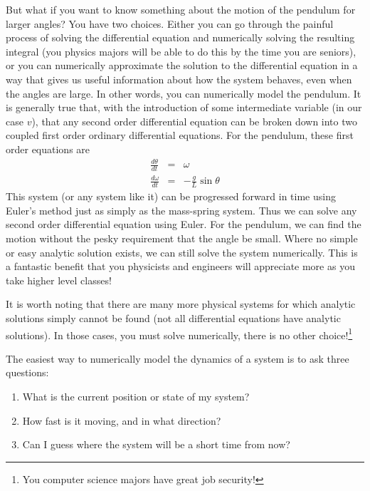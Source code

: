 \documentclass[twoside,11pt,ShortChapTitles]{BYUTextbook}
\begin{document}
But what if you want to know something about the motion of the pendulum for
larger angles? You have two choices. Either you can go through the painful
process of solving the differential equation and numerically solving the
resulting integral (you physics majors will be able to do this by the time
you are seniors), or you can numerically approximate the solution to the
differential equation in a way that gives us useful information about how
the system behaves, even when the angles are large. In other words, you can
numerically model the pendulum. It is generally true that, with the
introduction of some intermediate variable (in our case $v$), that any
second order differential equation can be broken down into two coupled first
order ordinary differential equations. For the pendulum, these first order
equations are 
\begin{eqnarray*}
\frac{d\theta }{dt} &=&\omega \\
\frac{d\omega }{dt} &=&-\frac{g}{L}\sin \theta
\end{eqnarray*}%
This system (or any system like it) can be progressed forward in time using
Euler's method just as simply as the mass-spring system. Thus we can solve
any second order differential equation using Euler. For the pendulum, we can
find the motion without the pesky requirement that the angle be small. Where
no simple or easy analytic solution exists, we can still solve the system
numerically. This is a fantastic benefit that you physicists and engineers
will appreciate more as you take higher level classes!

It is worth noting that there are many more physical systems for which
analytic solutions simply cannot be found (not all differential equations
have analytic solutions). In those cases, you must solve numerically, there
is no other choice!\footnote{%
You computer science majors have great job security!}

The easiest way to numerically model the dynamics of a system is to ask
three questions:

\begin{enumerate}
\item What is the current position or state of my system?

\item How fast is it moving, and in what direction?

\item Can I guess where the system will be a short time from now?
\end{enumerate}
\end{document}
